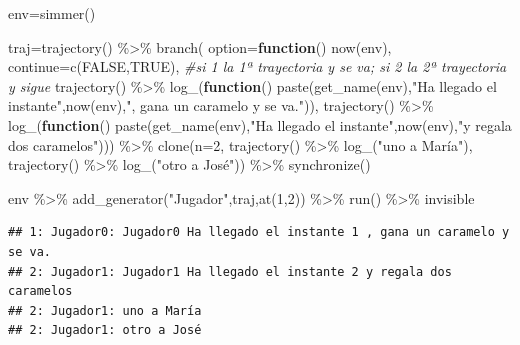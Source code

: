 \documentclass[
]{book}
\newenvironment{Shaded}{\begin{snugshade}}{\end{snugshade}}
\newcommand{\AttributeTok}[1]{\textcolor[rgb]{0.77,0.63,0.00}{#1}}
\newcommand{\CommentTok}[1]{\textcolor[rgb]{0.56,0.35,0.01}{\textit{#1}}}
\newcommand{\ConstantTok}[1]{\textcolor[rgb]{0.00,0.00,0.00}{#1}}
\newcommand{\ControlFlowTok}[1]{\textcolor[rgb]{0.13,0.29,0.53}{\textbf{#1}}}
\newcommand{\DecValTok}[1]{\textcolor[rgb]{0.00,0.00,0.81}{#1}}
\newcommand{\FunctionTok}[1]{\textcolor[rgb]{0.00,0.00,0.00}{#1}}
\newcommand{\NormalTok}[1]{#1}
\newcommand{\OtherTok}[1]{\textcolor[rgb]{0.56,0.35,0.01}{#1}}
\newcommand{\SpecialCharTok}[1]{\textcolor[rgb]{0.00,0.00,0.00}{#1}}
\newcommand{\StringTok}[1]{\textcolor[rgb]{0.31,0.60,0.02}{#1}}
\theoremstyle{definition}
\theoremstyle{definition}
\theoremstyle{definition}
\theoremstyle{definition}
\theoremstyle{remark}
\begin{document}
\begin{Shaded}
\begin{Highlighting}[]
\NormalTok{env}\OtherTok{=}\FunctionTok{simmer}\NormalTok{()}

\NormalTok{traj}\OtherTok{=}\FunctionTok{trajectory}\NormalTok{() }\SpecialCharTok{\%\textgreater{}\%}
  \FunctionTok{branch}\NormalTok{(}
    \AttributeTok{option=}\ControlFlowTok{function}\NormalTok{() }\FunctionTok{now}\NormalTok{(env), }\AttributeTok{continue=}\FunctionTok{c}\NormalTok{(}\ConstantTok{FALSE}\NormalTok{,}\ConstantTok{TRUE}\NormalTok{), }\CommentTok{\#si 1 la 1ª trayectoria y se va; si 2 la 2ª trayectoria y sigue}
      \FunctionTok{trajectory}\NormalTok{() }\SpecialCharTok{\%\textgreater{}\%} \FunctionTok{log\_}\NormalTok{(}\ControlFlowTok{function}\NormalTok{() }\FunctionTok{paste}\NormalTok{(}\FunctionTok{get\_name}\NormalTok{(env),}\StringTok{"Ha llegado el instante"}\NormalTok{,}\FunctionTok{now}\NormalTok{(env),}\StringTok{", gana un caramelo y se va."}\NormalTok{)), }
      \FunctionTok{trajectory}\NormalTok{() }\SpecialCharTok{\%\textgreater{}\%} \FunctionTok{log\_}\NormalTok{(}\ControlFlowTok{function}\NormalTok{() }\FunctionTok{paste}\NormalTok{(}\FunctionTok{get\_name}\NormalTok{(env),}\StringTok{"Ha llegado el instante"}\NormalTok{,}\FunctionTok{now}\NormalTok{(env),}\StringTok{"y regala dos caramelos"}\NormalTok{))) }\SpecialCharTok{\%\textgreater{}\%} 
  \FunctionTok{clone}\NormalTok{(}\AttributeTok{n=}\DecValTok{2}\NormalTok{, }
    \FunctionTok{trajectory}\NormalTok{() }\SpecialCharTok{\%\textgreater{}\%} \FunctionTok{log\_}\NormalTok{(}\StringTok{"uno a María"}\NormalTok{), }
    \FunctionTok{trajectory}\NormalTok{() }\SpecialCharTok{\%\textgreater{}\%} \FunctionTok{log\_}\NormalTok{(}\StringTok{"otro a José"}\NormalTok{)) }\SpecialCharTok{\%\textgreater{}\%}  
  \FunctionTok{synchronize}\NormalTok{() }
  
\NormalTok{env }\SpecialCharTok{\%\textgreater{}\%}
  \FunctionTok{add\_generator}\NormalTok{(}\StringTok{"Jugador"}\NormalTok{,traj,}\FunctionTok{at}\NormalTok{(}\DecValTok{1}\NormalTok{,}\DecValTok{2}\NormalTok{)) }\SpecialCharTok{\%\textgreater{}\%}
  \FunctionTok{run}\NormalTok{() }\SpecialCharTok{\%\textgreater{}\%}
\NormalTok{  invisible}
\end{Highlighting}
\end{Shaded}

\begin{verbatim}
## 1: Jugador0: Jugador0 Ha llegado el instante 1 , gana un caramelo y se va.
## 2: Jugador1: Jugador1 Ha llegado el instante 2 y regala dos caramelos
## 2: Jugador1: uno a María
## 2: Jugador1: otro a José
\end{verbatim}
\end{document}
